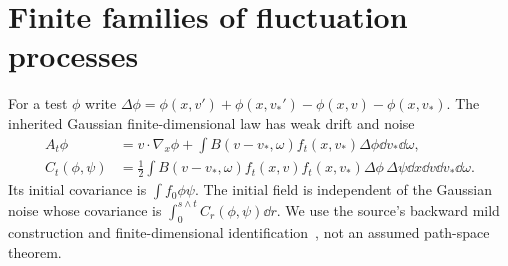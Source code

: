 \section{Finite families of fluctuation processes}\label{sec:functional}
For a test $\phi$ write
$\Delta\phi=\phi(x,v')+\phi(x,v_*')-\phi(x,v)-\phi(x,v_*)$.
The inherited Gaussian finite-dimensional law has weak drift and noise
\begin{align*}
 A_t\phi&=v\cdot\nabla_x\phi+
       \int B(v-v_*,\omega)f_t(x,v_*)\Delta\phi\dd v_*\dd\omega,\\
 C_t(\phi,\psi)&=\tfrac12\int
       B(v-v_*,\omega)f_t(x,v)f_t(x,v_*)
                  \Delta\phi\,\Delta\psi\dd x\dd v\dd v_*\dd\omega .
\end{align*}
Its initial covariance is $\int f_0\phi\psi$.
The initial field is independent of the Gaussian noise whose covariance
is $\int_0^{s\wedge t}C_r(\phi,\psi)\dd r$.
We use the source's backward mild construction and finite-dimensional
identification~\cite[\S\S2,7--8]{U}, not an assumed path-space theorem.


